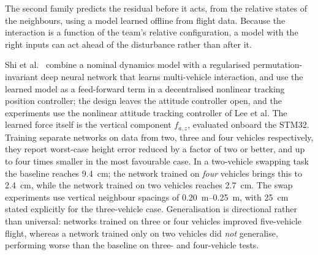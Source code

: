 The second family predicts the residual before it acts, from the relative states of the
neighbours, using a model learned offline from flight data. Because the interaction is a function
of the team's relative configuration, a model with the right inputs can act ahead of the
disturbance rather than after it.

Shi et al.~\cite{shi2020neuralswarm} combine a nominal dynamics model with a regularised
permutation-invariant deep neural network that learns multi-vehicle interaction, and use the
learned model as a feed-forward term in a decentralised nonlinear tracking position controller;
the design leaves the attitude controller open, and the experiments use the nonlinear attitude
tracking controller of Lee et al. The learned
force itself is the vertical component \(f_{a,z}\), evaluated onboard the STM32. Training
separate networks on data from two, three and four vehicles respectively, they report worst-case
height error reduced by a factor of two or better, and up to four times smaller in the most
favourable case. In a two-vehicle swapping task the baseline reaches \SI{9.4}{\centi\metre};
the network trained on \emph{four} vehicles brings this to \SI{2.4}{\centi\metre}, while the
network trained on two vehicles reaches \SI{2.7}{\centi\metre}. The swap experiments use vertical
neighbour spacings of \SIrange{0.20}{0.25}{\metre}, with \SI{25}{\centi\metre} stated explicitly
for the three-vehicle case. Generalisation is directional rather than universal: networks trained
on three or four vehicles improved five-vehicle flight, whereas a network trained only on two
vehicles did \emph{not} generalise, performing worse than the baseline on three- and four-vehicle
tests.

